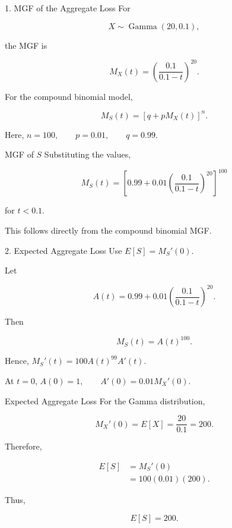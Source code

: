 \documentclass[
  ignorenonframetext,
  aspectratio=169,
]{beamer}
\begin{document}
\begin{frame}{1. MGF of the Aggregate Loss}
\protect{}\label{mgf-of-the-aggregate-loss}
For

\[
X\sim\operatorname{Gamma}(20,0.1),
\]

the MGF is

\[
M_X(t)
=
\left(\frac{0.1}{0.1-t}\right)^{20}.
\]

For the compound binomial model,

\[
M_S(t)
=
\left[q+pM_X(t)\right]^n.
\]

Here, \(n=100,\qquad p=0.01,\qquad q=0.99.\)
\end{frame}

\begin{frame}{MGF of \(S\)}
\protect{}\label{mgf-of-s}
Substituting the values,

\[
\boxed{
M_S(t)=
\left[
0.99+
0.01\left(\frac{0.1}{0.1-t}\right)^{20}
\right]^{100}
}
\]

for \(t<0.1\).

This follows directly from the compound binomial MGF.
\end{frame}

\begin{frame}{2. Expected Aggregate Loss}
\protect{}\label{expected-aggregate-loss-1}
Use \(E[S]=M_S'(0).\)

Let

\[
A(t)=
0.99+
0.01\left(\frac{0.1}{0.1-t}\right)^{20}.
\]

Then

\[
M_S(t)=A(t)^{100}.
\]

Hence, \(M_S'(t)=100A(t)^{99}A'(t).\)

At \(t=0\), \qquad \(A(0)=1, \qquad A'(0)=0.01M_X'(0).\)
\end{frame}

\begin{frame}{Expected Aggregate Loss}
\protect{}\label{expected-aggregate-loss-2}
For the Gamma distribution,

\[
M_X'(0)=E[X]
=\frac{20}{0.1}=200.
\]

Therefore,

\[
\begin{aligned}
E[S]
&=M_S'(0)\\
&=100(0.01)(200).
\end{aligned}
\]

Thus,

\[
\boxed{E[S]=200}.
\]
\end{frame}
\end{document}
